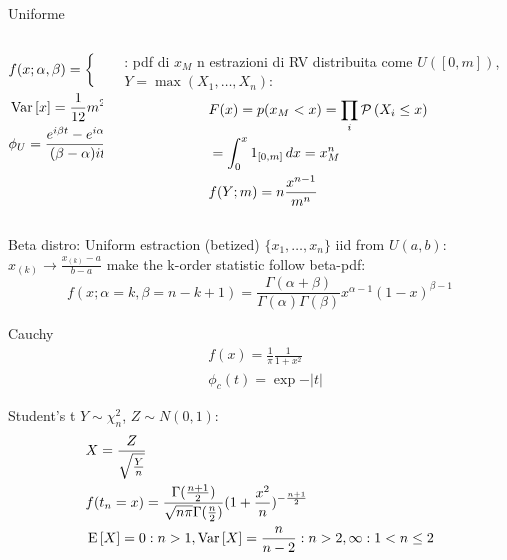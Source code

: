 \documentclass[asd-beamer.tex]{subfiles}%
\begin{document}
\begin{frame}{Uniforme}
\begin{columns}[T]
	\begin{column}{0.5\textwidth}
	\begin{align*}
	&f(x;\alpha,\beta)=\left\{\begin{array}{c}\frac{1}{\beta-\alpha}\\0\\
	\end{array}\right.\\
	&\operatorname{Var}{[x]}=\frac{1}{12}m^2\\
	&\phi_U=\frac{e^{i\beta t}-e^{i\alpha t}}{(\beta-\alpha)it}
	\end{align*}
	\end{column}
	\begin{column}{0.5\textwidth}
	\begin{block}{: pdf di $x_M$}
		n estrazioni di RV distribuita come $U([0,m])$, $Y=\max{(X_1,\ldots,X_n)}$:
		\begin{align*}
		&F(x)=p(x_M<x)=\prod_i\operatorname{\mathcal{P}}{(X_i\leq x)}\\
		&=\int_0^x1_{[0,m]}\,dx=x_M^n\\
		&f(Y;m)=n\frac{x^{n-1}}{m^n}
		\end{align*}
	\end{block}
\end{column}
\end{columns}
\end{frame}

\begin{frame}{Beta distro: Uniform estraction (betized)}
$\{x_1,\ldots,x_n\}$ iid from $U(a,b)$: $x_{(k)}\to\frac{x_{(k)}-a}{b-a}$ make the k-order statistic follow beta-pdf:
\[f(x;\alpha=k,\beta=n-k+1)=\frac{\Gamma(\alpha+\beta)}{\Gamma(\alpha)\Gamma(\beta)}x^{\alpha-1}(1-x)^{\beta-1}\]
\end{frame}

\begin{frame}{Cauchy}
\begin{align*}
&f(x)=\frac{1}{\pi}\frac{1}{1+x^2}\\
&\phi_c(t)=\exp{-|t|}
\end{align*}
\end{frame}

\begin{frame}{Student's t}
$Y\sim\chi^2_n$, $Z\sim N(0,1)$:
\begin{align*}
&X=\frac{Z}{\sqrt{\frac{Y}{n}}}\\
&f(t_n=x)=\frac{\Gamma(\frac{n+1}{2})}{\sqrt{n\pi}\Gamma(\frac{n}{2})}(1+\frac{x^2}{n})^{-\frac{n+1}{2}}\\
&\operatorname{E}{[X]}=0: n>1, \operatorname{Var}{[X]}=\frac{n}{n-2}: n>2, \infty: 1<n\leq2
\end{align*}
\end{frame}
\end{document}
